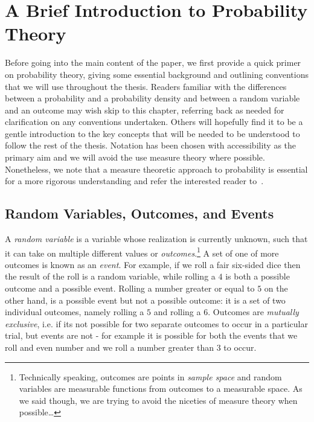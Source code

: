 
\chapter{A Brief Introduction to Probability Theory}
\label{chp:prob}

Before going into the main content of the paper, we first provide a quick primer on probability
theory, giving some essential background and outlining conventions
that we will use throughout the thesis.  Readers familiar with the differences between a probability
and a probability density and between a random variable and an outcome may wish skip to this
chapter, referring back as needed for clarification on any conventions undertaken.  Others
will hopefully find it to be a gentle introduction to the key concepts that will be needed to
be understood to follow the rest of the thesis.  Notation has been chosen with accessibility 
as the primary aim and we will avoid
the use measure theory where possible.  Nonetheless, we note that a measure theoretic
approach to probability is essential for a more rigorous understanding and refer
the interested reader to~\cite{durrett2010probability}.

\section{Random Variables, Outcomes, and Events}
\label{sec:prob:random}

A \emph{random variable} is a variable
whose realization is currently unknown, such that it can take on multiple different
values or \emph{outcomes}.\footnote{Technically speaking, outcomes are points in \emph{sample
		space} and random variables are measurable functions from outcomes to a measurable
	space.  As we said though, we are trying to avoid the niceties of measure theory when
	 possible\dots}
A set of one of more outcomes is known as an \emph{event}.
For example, if we roll a fair six-sided dice then the result of the roll is a random variable, 
while rolling a $4$ is both a possible outcome and a possible event.  Rolling a number greater
or equal to $5$ on the other hand, is a possible event but not a possible outcome: it is a set
of two individual outcomes, namely rolling a $5$ and rolling a $6$.  Outcomes are
\emph{mutually exclusive}, i.e. if its not possible for two separate outcomes to occur in a
particular trial, but events are not - for example it is possible for both the events that we
roll and even number and we roll a number greater than $3$ to occur.

